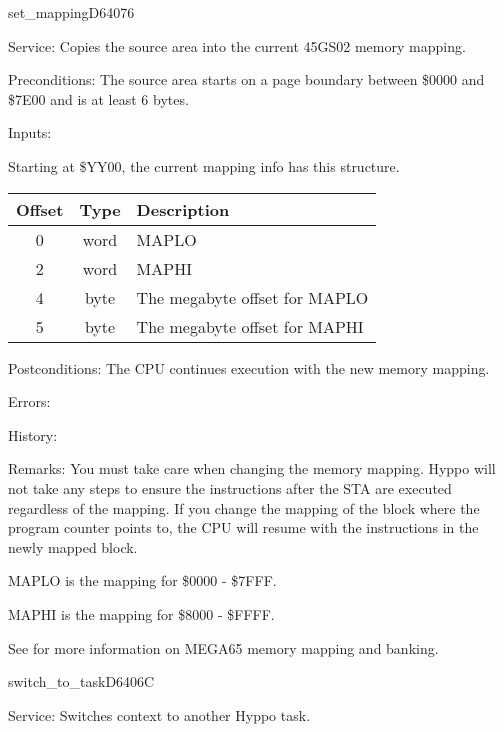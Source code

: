 \newpage
\begin{hyppotrap}{set\_mapping}{D640}{76}
\item [Service:]
  Copies the source area into the current 45GS02 memory mapping.
\item [Preconditions:]
  The source area starts on a page boundary between \$0000 and \$7E00 and
  is at least 6 bytes.
\item [Inputs:]

  Starting at \$YY00, the current mapping info has this structure.
  {\setlength{\tabcolsep}{2mm}
  \begin{tabular}{|c|c|p{6.9cm}|}
  \hline
  \textbf{Offset} & \textbf{Type} & \textbf{Description} \\
  \hline
  0 & word & MAPLO \\
  2 & word & MAPHI \\
  4 & byte & The megabyte offset for MAPLO \\
  5 & byte & The megabyte offset for MAPHI \\
  \hline
  \end{tabular}
  }
\item [Postconditions:]
  The CPU continues execution with the new memory mapping.
\item [Errors:]
\item [History:]
\item [Remarks:]
  You must take care when changing the memory mapping. Hyppo will not take any
  steps to ensure the instructions after the STA are executed regardless of the
  mapping. If you change the mapping of the block where the program counter
  points to, the CPU will resume with the instructions in the newly mapped
  block.

  MAPLO is the mapping for \$0000 - \$7FFF.

  MAPHI is the mapping for \$8000 - \$FFFF.

  See  for more information on MEGA65 memory mapping and
  banking.
\end{hyppotrap}


\newpage
\begin{hyppotrap}{switch\_to\_task}{D640}{6C}
\item [Service:]
  Switches context to another Hyppo task.
\notimplemented
\end{hyppotrap}


